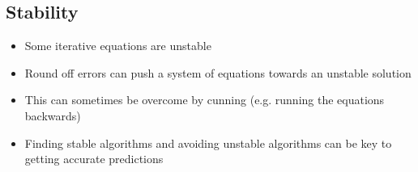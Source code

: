 
\begin{slide}
\section{Stability}

\begin{PauseHighLight}
  \begin{itemize}
  \item Some iterative equations are unstable\pause
  \item Round off errors can push a system of equations towards an
    unstable solution\pause
  \item This can sometimes be overcome by cunning (e.g. running the
    equations backwards)\pause
  \item Finding stable algorithms and avoiding unstable algorithms can
    be key to getting accurate predictions\pause
  \end{itemize}
\end{PauseHighLight}


\end{slide}

\Outline %

